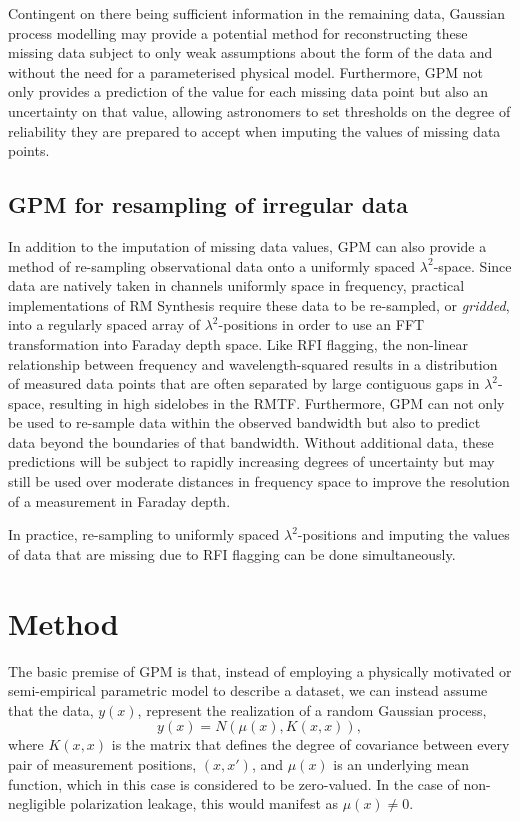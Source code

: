 \documentclass[fleqn,usenatbib]{mnras}
\begin{document}
Contingent on there being sufficient information in the remaining data, Gaussian process modelling may provide a potential method for reconstructing these missing data subject to only weak assumptions about the form of the data and without the need for a parameterised physical model. Furthermore, GPM not only provides a prediction of the value for each missing data point but also an uncertainty on that value, allowing astronomers to set thresholds on the degree of reliability they are prepared to accept when imputing the values of missing data points.

\subsection{GPM for resampling of irregular data}
\label{sec:resampling}

In addition to the imputation of missing data values, GPM can also provide a method of re-sampling observational data onto a uniformly spaced $\lambda^2$-space. Since data are natively taken in channels uniformly space in frequency, practical implementations of RM Synthesis require these data to be re-sampled, or {\it gridded}, into a regularly spaced array of $\lambda^2$-positions in order to use an FFT transformation into Faraday depth space. Like RFI flagging, the non-linear relationship between frequency and wavelength-squared results in a distribution of measured data points that are often separated by large contiguous gaps in $\lambda^2$-space, resulting in high sidelobes in the RMTF. Furthermore, GPM can not only be used to re-sample data within the observed bandwidth but also to predict data beyond the boundaries of that bandwidth. Without additional data, these predictions will be subject to rapidly increasing degrees of uncertainty but may still be used over moderate distances in frequency space to improve the resolution of a measurement in Faraday depth.

In practice, re-sampling to uniformly spaced $\lambda^2$-positions and imputing the values of data that are missing due to RFI flagging can be done simultaneously.


\section{Method}
\label{sec:method}

The basic premise of GPM is that, instead of employing a physically motivated or semi-empirical parametric model to describe a dataset, we can instead assume that the data, $y(x)$, represent the realization of a random Gaussian process,
%
\begin{equation}
y(x) = N(\mu(x), K(x,x)),
\end{equation}
%
where $K(x,x)$ is the matrix that defines the degree of covariance between every pair of measurement positions, $(x,x')$, and $\mu(x)$ is an underlying mean function, which in this case is considered to be zero-valued. In the case of non-negligible polarization leakage, this would manifest as $\mu(x)\neq 0$.
\end{document}
